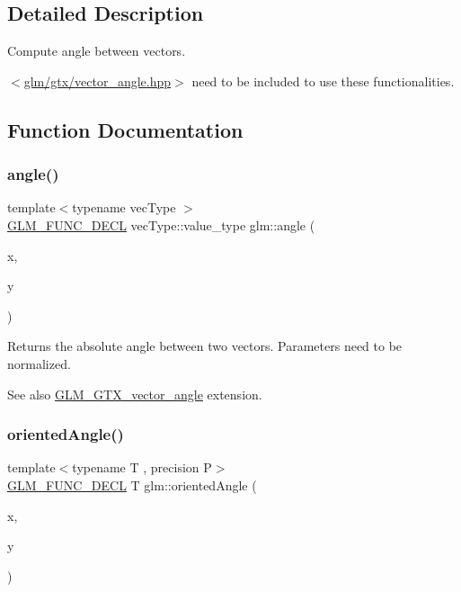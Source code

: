 \subsection{Detailed Description}
Compute angle between vectors. 

$<$\mbox{\hyperlink{vector__angle_8hpp}{glm/gtx/vector\+\_\+angle.\+hpp}}$>$ need to be included to use these functionalities. 

\subsection{Function Documentation}
\mbox{\label{group__gtx__vector__angle_gab8691008a2536b681b711211816c14f7}} 
\subsubsection{\texorpdfstring{angle()}{angle()}}
{\footnotesize\ttfamily template$<$typename vec\+Type $>$ \\
\mbox{\hyperlink{setup_8hpp_ab2d052de21a70539923e9bcbf6e83a51}{G\+L\+M\+\_\+\+F\+U\+N\+C\+\_\+\+D\+E\+CL}} vec\+Type\+::value\+\_\+type glm\+::angle (\begin{DoxyParamCaption}\item[{vec\+Type const \&}]{x,  }\item[{vec\+Type const \&}]{y }\end{DoxyParamCaption})}

Returns the absolute angle between two vectors. Parameters need to be normalized. \begin{DoxySeeAlso}{See also}
\mbox{\hyperlink{group__gtx__vector__angle}{G\+L\+M\+\_\+\+G\+T\+X\+\_\+vector\+\_\+angle}} extension. 
\end{DoxySeeAlso}
\mbox{\label{group__gtx__vector__angle_ga82a19d474be13c92c7b10caab42a5a72}} 
\subsubsection{\texorpdfstring{orientedAngle()}{orientedAngle()}\hspace{0.1cm}{\footnotesize\ttfamily [1/2]}}
{\footnotesize\ttfamily template$<$typename T , precision P$>$ \\
\mbox{\hyperlink{setup_8hpp_ab2d052de21a70539923e9bcbf6e83a51}{G\+L\+M\+\_\+\+F\+U\+N\+C\+\_\+\+D\+E\+CL}} T glm\+::oriented\+Angle (\begin{DoxyParamCaption}\item[{\mbox{\hyperlink{structglm_1_1tvec2}{tvec2}}$<$ T, P $>$ const \&}]{x,  }\item[{\mbox{\hyperlink{structglm_1_1tvec2}{tvec2}}$<$ T, P $>$ const \&}]{y }\end{DoxyParamCaption})}

